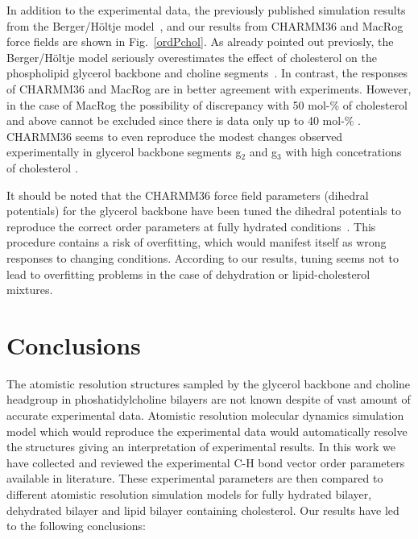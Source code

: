 \documentclass[pre,aps,floatfix,authordate1-4,twocolumn]{revtex4-1}
\begin{document}
In addition to the experimental data, the previously published simulation results from the Berger/H\"oltje model~\cite{ferreira13},
and our results from CHARMM36 and MacRog force fields  
are shown in Fig.~\ref{ordPchol}. As already pointed out previosly, the Berger/H\"oltje model
seriously overestimates the effect of cholesterol on the phospholipid glycerol backbone and choline segments~\cite{ferreira13}.
In contrast, the responses of CHARMM36 and MacRog are in better agreement
with experiments. However, in the case of MacRog the possibility of discrepancy with 50 mol-\% of cholesterol
and above cannot be excluded since there is data only up to 40 mol-\% 
. 
CHARMM36 seems to even reproduce the modest changes observed experimentally in glycerol backbone segments 
g$_2$ and g$_3$ with high concetrations of cholesterol .

It should be noted that the CHARMM36 force field parameters (dihedral potentials) for the glycerol backbone have been tuned 
the dihedral potentials to reproduce the correct order parameters at fully hydrated conditions~\cite{klauda10}. 
This procedure contains a risk of overfitting, which would manifest itself as wrong responses to changing conditions. 
According to our results, tuning seems not to lead to overfitting problems in the case of dehydration or lipid-cholesterol mixtures. 



\section{Conclusions}
The atomistic resolution structures sampled by the glycerol backbone and choline headgroup
in phoshatidylcholine bilayers are not known despite of vast amount of accurate experimental
data. Atomistic resolution molecular dynamics simulation model which would reproduce the
experimental data would automatically resolve the structures giving an interpretation of experimental results.
In this work we have collected and reviewed the experimental C-H bond vector order
parameters available in literature. These experimental parameters are then compared to
different atomistic resolution simulation models for fully hydrated bilayer, dehydrated bilayer and
lipid bilayer containing cholesterol. Our results have led to the following conclusions:
\end{document}
